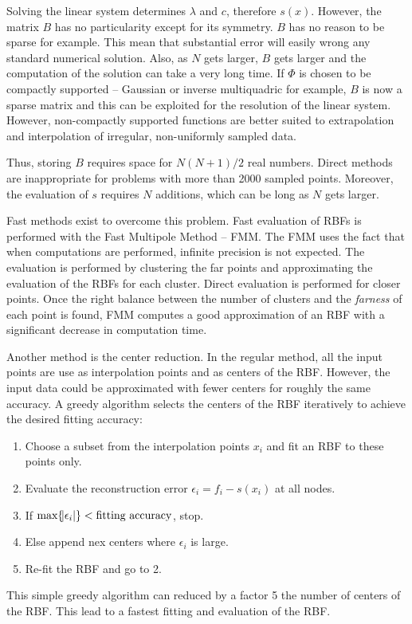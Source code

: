 \documentclass[a4paper]{article}
\begin{document}
Solving the linear system determines $\lambda$ and $c$, therefore $s(x)$. However, the matrix $B$ has no particularity except for its symmetry. $B$ has no reason to be sparse for example. This mean that substantial error will easily wrong any standard numerical solution. Also, as $N$ gets larger, $B$ gets larger and the computation of the solution can take a very long time. If $\Phi$ is chosen to be compactly supported -- Gaussian or inverse multiquadric for example, $B$ is now a sparse matrix and this can be exploited for the resolution of the linear system. However, non-compactly supported functions are better suited to extrapolation and interpolation of irregular, non-uniformly sampled data.

Thus, storing $B$ requires space for $N(N+1)/2$ real numbers. Direct methods are inappropriate for problems with more than 2000 sampled points. Moreover, the evaluation of $s$ requires $N$ additions, which can be long as $N$ gets larger.

Fast methods exist to overcome this problem. Fast evaluation of RBFs is performed with the Fast Multipole Method -- FMM. The FMM uses the fact that when computations are performed, infinite precision is not expected. The evaluation is performed by clustering the far points and approximating the evaluation of the RBFs for each cluster. Direct evaluation is performed for closer points. Once the right balance between the number of clusters and the \emph{farness} of each point is found, FMM computes a good approximation of an RBF with a significant decrease in computation time.

Another method is the center reduction. In the regular method, all the input points are use as interpolation points and as centers of the RBF. However, the input data could be approximated with fewer centers for roughly the same accuracy. A greedy algorithm selects the centers of the RBF iteratively to achieve the desired fitting accuracy:
\begin{enumerate}
\item Choose a subset from the interpolation points $x_i$ and fit an RBF to these points only.
\item Evaluate the reconstruction error $\epsilon_i = f_i - s(x_i)$ at all nodes.
\item If $\text{max}\{\abs{\epsilon_i}\} < \text{fitting accuracy}$, stop.
\item Else append nex centers where $\epsilon_i$ is large.
\item Re-fit the RBF and go to 2.
\end{enumerate}
This simple greedy algorithm can reduced by a factor 5 the number of centers of the RBF. This lead to a fastest fitting and evaluation of the RBF.
\end{document}
